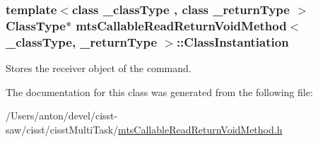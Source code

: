 \subsubsection[{Class\+Instantiation}]{\setlength{\rightskip}{0pt plus 5cm}template$<$class \+\_\+class\+Type , class \+\_\+return\+Type $>$ {\bf Class\+Type}$\ast$ {\bf mts\+Callable\+Read\+Return\+Void\+Method}$<$ \+\_\+class\+Type, \+\_\+return\+Type $>$\+::Class\+Instantiation\hspace{0.3cm}{\ttfamily [protected]}}\label{classmts_callable_read_return_void_method_af6aea9b2b635f8ea4be1f2946fa7f1c7}
Stores the receiver object of the command. 

The documentation for this class was generated from the following file\+:\begin{DoxyCompactItemize}
\item 
/\+Users/anton/devel/cisst-\/saw/cisst/cisst\+Multi\+Task/\hyperlink{mts_callable_read_return_void_method_8h}{mts\+Callable\+Read\+Return\+Void\+Method.\+h}\end{DoxyCompactItemize}
